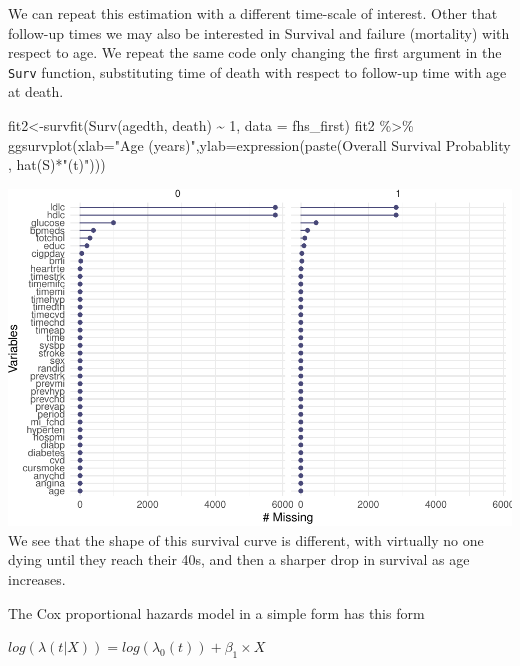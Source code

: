 \documentclass[
]{book}
\newenvironment{Shaded}{\begin{snugshade}}{\end{snugshade}}
\newcommand{\AttributeTok}[1]{\textcolor[rgb]{0.77,0.63,0.00}{#1}}
\newcommand{\DecValTok}[1]{\textcolor[rgb]{0.00,0.00,0.81}{#1}}
\newcommand{\FunctionTok}[1]{\textcolor[rgb]{0.00,0.00,0.00}{#1}}
\newcommand{\NormalTok}[1]{#1}
\newcommand{\OtherTok}[1]{\textcolor[rgb]{0.56,0.35,0.01}{#1}}
\newcommand{\SpecialCharTok}[1]{\textcolor[rgb]{0.00,0.00,0.00}{#1}}
\newcommand{\StringTok}[1]{\textcolor[rgb]{0.31,0.60,0.02}{#1}}
\begin{document}
We can repeat this estimation with a different time-scale of interest. Other that follow-up times we may also be interested in Survival and failure (mortality) with respect to age. We repeat the same code only changing the first argument in the \texttt{Surv} function, substituting time of death with respect to follow-up time with age at death.

\begin{Shaded}
\begin{Highlighting}[]
\NormalTok{fit2}\OtherTok{\textless{}{-}}\FunctionTok{survfit}\NormalTok{(}\FunctionTok{Surv}\NormalTok{(agedth, death) }\SpecialCharTok{\textasciitilde{}} \DecValTok{1}\NormalTok{, }\AttributeTok{data =}\NormalTok{ fhs\_first)}
\NormalTok{fit2 }\SpecialCharTok{\%\textgreater{}\%}
\FunctionTok{ggsurvplot}\NormalTok{(}\AttributeTok{xlab=}\StringTok{"Age (years)"}\NormalTok{,}\AttributeTok{ylab=}\FunctionTok{expression}\NormalTok{(}\FunctionTok{paste}\NormalTok{(}\StringTok{\textquotesingle{}Overall Survival Probablity \textquotesingle{}}\NormalTok{, }\FunctionTok{hat}\NormalTok{(S)}\SpecialCharTok{*}\StringTok{"(t)"}\NormalTok{)))}
\end{Highlighting}
\end{Shaded}

\includegraphics{adv_epi_analysis_files/figure-latex/unnamed-chunk-99-1.pdf}
We see that the shape of this survival curve is different, with virtually no one dying until they reach their 40s, and then a sharper drop in survival as age increases.

The Cox proportional hazards model in a simple form has this form

\(log(\lambda(t|X))=log(\lambda_{0}(t))+\beta_{1}\times X\)
\end{document}

